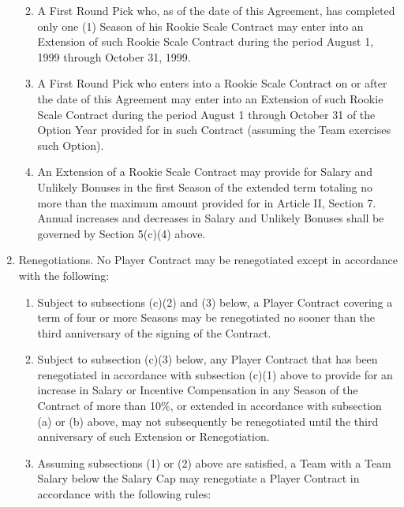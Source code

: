 \documentclass[
]{book}
\providecommand{\tightlist}{%
  \setlength{\itemsep}{0pt}\setlength{\parskip}{0pt}}
\begin{document}
\begin{enumerate}
  \begin{enumerate}
  \def\labelenumii{(\arabic{enumii})}
  \tightlist
  \item
    A First Round Pick who, as of the date of this Agreement, has completed only one (1) Season of his Rookie Scale Contract may enter into an Extension of such Rookie Scale Contract during the period August 1, 1999 through October 31, 1999.
  \item
    A First Round Pick who enters into a Rookie Scale Contract on or after the date of this Agreement may enter into an Extension of such Rookie Scale Contract during the period August 1 through October 31 of the Option Year provided for in such Contract (assuming the Team exercises such Option).
  \item
    An Extension of a Rookie Scale Contract may provide for Salary and Unlikely Bonuses in the first Season of the extended term totaling no more than the maximum amount provided for in Article II, Section 7. Annual increases and decreases in Salary and Unlikely Bonuses shall be governed by Section 5(c)(4) above.
  \end{enumerate}
\item
  Renegotiations. No Player Contract may be renegotiated except in accordance with the following:

  \begin{enumerate}
  \def\labelenumii{(\arabic{enumii})}
  \tightlist
  \item
    Subject to subsections (c)(2) and (3) below, a Player Contract covering a term of four or more Seasons may be renegotiated no sooner than the third anniversary of the signing of the Contract.
  \item
    Subject to subsection (c)(3) below, any Player Contract that has been renegotiated in accordance with subsection (c)(1) above to provide for an increase in Salary or Incentive Compensation in any Season of the Contract of more than 10\%, or extended in accordance with subsection (a) or (b) above, may not subsequently be renegotiated until the third anniversary of such Extension or Renegotiation.
  \item
    Assuming subsections (1) or (2) above are satisfied, a Team with a Team Salary below the Salary Cap may renegotiate a Player Contract in accordance with the following rules:


\end{enumerate}
\end{enumerate}
\end{document}
